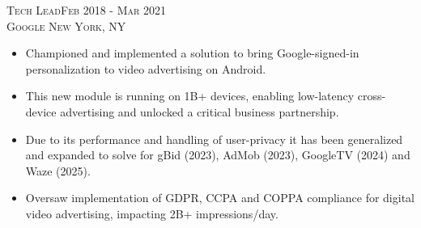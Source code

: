 \textsc{Tech Lead\hfill Feb 2018 - Mar 2021\\}
\textsc{Google \hfill New York, NY\\}
\begin{itemize}
	\setlength{\itemsep}{1pt}
	\setlength{\parskip}{0pt}
	\setlength{\parsep}{0pt}
	\setlength{\leftmargin}{-5mm}
  \item Championed and implemented a solution to bring Google-signed-in personalization to video advertising on Android.

  \item This new module is running on 1B+ devices, enabling low-latency cross-device advertising and unlocked a critical business partnership.
 
  \item Due to its performance and handling of user-privacy it has been generalized and expanded to solve for gBid (2023), AdMob (2023), GoogleTV (2024) and Waze (2025).

  \item Oversaw implementation of GDPR, CCPA and COPPA compliance for digital video advertising, impacting 2B+ impressions/day.







\end{itemize}

